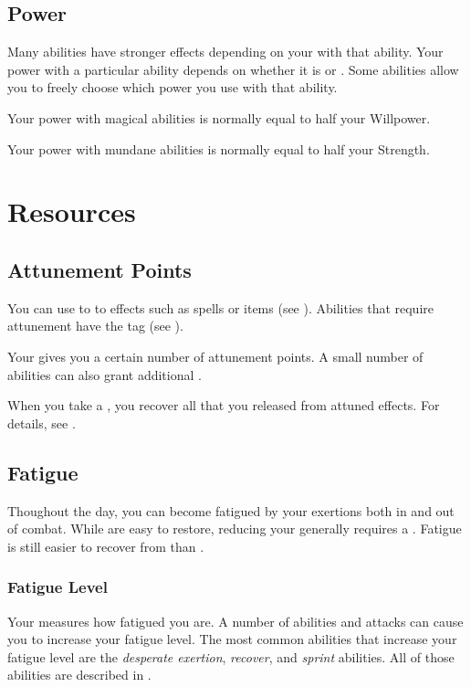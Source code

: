     \subsection{Power}\label{Power}
        Many abilities have stronger effects depending on your  with that ability.
        Your power with a particular ability depends on whether it is  or .
        Some abilities allow you to freely choose which power you use with that ability.

        Your power with magical abilities is normally equal to half your Willpower.

        Your power with mundane abilities is normally equal to half your Strength.

\section{Resources}\label{Resources}

    \subsection{Attunement Points}\label{Attunement Points}
        You can use  to  to effects such as spells or items (see ).
        Abilities that require attunement have the  tag (see ).

        Your  gives you a certain number of attunement points.
        A small number of abilities can also grant additional .

        When you take a , you recover all  that you released from attuned effects.
        For details, see .

    \subsection{Fatigue}\label{Fatigue}
        Thoughout the day, you can become fatigued by your exertions both in and out of combat.
        While  are easy to restore, reducing your  generally requires a .
        Fatigue is still easier to recover from than .

        \subsubsection{Fatigue Level}\label{Fatigue Level}
            Your  measures how fatigued you are.
            A number of abilities and attacks can cause you to increase your fatigue level.
            The most common abilities that increase your fatigue level are the \textit{desperate exertion}, \textit{recover}, and \textit{sprint} abilities.
            All of those abilities are described in .

